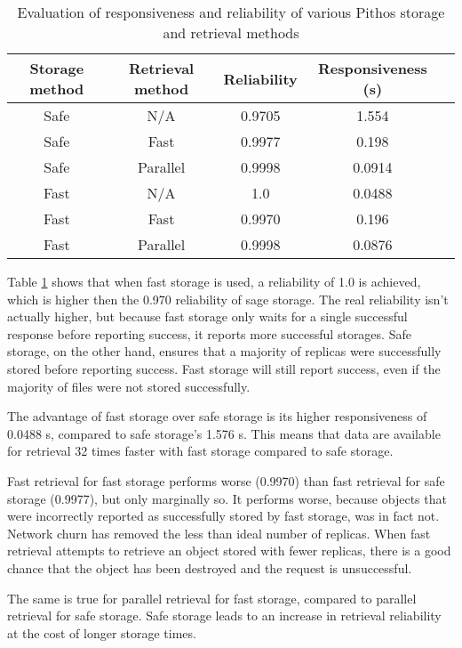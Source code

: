 \begin{table}[htbp]
\centering
\begin{tabular}{|c|c|c|c|c|}
\hline
Storage method & Retrieval method & Reliability & Responsiveness (s)\\
\hline
Safe    &   N/A         &   0.9705  &   1.554  \\
Safe    &   Fast        &   0.9977  &   0.198  \\
Safe    &   Parallel    &   0.9998  &   0.0914 \\
Fast    &   N/A         &   1.0     &   0.0488 \\
Fast    &   Fast        &   0.9970  &   0.196  \\
Fast    &   Parallel    &   0.9998  &   0.0876 \\
\hline
\end{tabular}
\caption{Evaluation of responsiveness and reliability of various Pithos storage and retrieval methods}
\label{tab_pithos_rel_resp_results}
\end{table}

Table \ref{tab_pithos_rel_resp_results} shows that when fast storage is used, a reliability of 1.0 is achieved, which is higher then the 0.970 reliability of sage storage. The real reliability isn't actually higher, but because fast storage only waits for a single successful response before reporting success, it reports more successful storages. Safe storage, on the other hand, ensures that a majority of replicas were successfully stored before reporting success. Fast storage will still report success, even if the majority of files were not stored successfully.

The advantage of fast storage over safe storage is its higher responsiveness of 0.0488 s, compared to safe storage's 1.576 s. This means that data are available for retrieval 32 times faster with fast storage compared to safe storage.

Fast retrieval for fast storage performs worse (0.9970) than fast retrieval for safe storage (0.9977), but only marginally so. It performs worse, because objects that were incorrectly reported as successfully stored by fast storage, was in fact not. Network churn has removed the less than ideal number of replicas. When fast retrieval attempts to retrieve an object stored with fewer replicas, there is a good chance that the object has been destroyed and the request is unsuccessful.

The same is true for parallel retrieval for fast storage, compared to parallel retrieval for safe storage. Safe storage leads to an increase in retrieval reliability at the cost of longer storage times.

